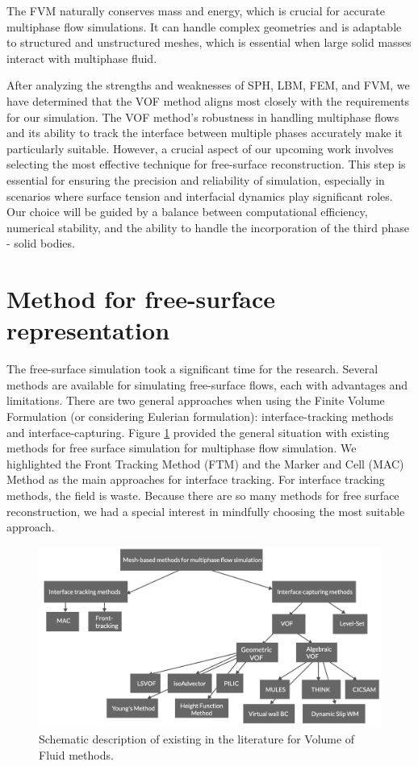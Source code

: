 The FVM naturally conserves mass and energy, which is crucial for accurate multiphase flow simulations. It can handle complex geometries and is adaptable to structured and unstructured meshes, which is essential when large solid masses interact with multiphase fluid.

After analyzing the strengths and weaknesses of SPH, LBM, FEM, and FVM, we have determined that the VOF method aligns most closely with the requirements for our simulation. The VOF method's robustness in handling multiphase flows and its ability to track the interface between multiple phases accurately make it particularly suitable. However, a crucial aspect of our upcoming work involves selecting the most effective technique for free-surface reconstruction. This step is essential for ensuring the precision and reliability of simulation, especially in scenarios where surface tension and interfacial dynamics play significant roles. Our choice will be guided by a balance between computational efficiency, numerical stability, and the ability to handle the incorporation of the third phase - solid bodies.

\section{Method for free-surface representation} %

The free-surface simulation took a significant time for the research. Several methods are available for simulating free-surface flows, each with advantages and limitations. There are two general approaches when using the Finite Volume Formulation (or considering Eulerian formulation): interface-tracking methods and interface-capturing. Figure \ref{fig:vof_methods} provided the general situation with existing methods for free surface simulation for multiphase flow simulation. We highlighted the Front Tracking Method (FTM)\cite{front-tracking} and the Marker and Cell (MAC) Method \cite{mac} as the main approaches for interface tracking. For interface tracking methods, the field is waste. Because there are so many methods for free surface reconstruction, we had a special interest in mindfully choosing the most suitable approach.

\begin{figure}[!ht]
    \centering
    \includegraphics[width=14.5cm]{GWU_Thesis_Sarmakeeva/Images/chap1/VOF_methods.png}
    \caption{Schematic description of existing in the literature for Volume of Fluid methods.}
    \label{fig:vof_methods}
\end{figure}



